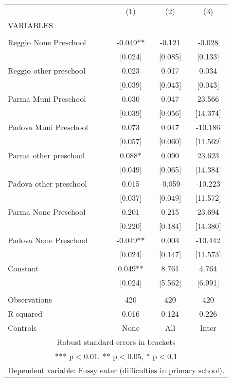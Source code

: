 \begin{tabular}{lccc} \hline
 & (1) & (2) & (3) \\
VARIABLES &  &  &  \\ \hline
 &  &  &  \\
Reggio None Preschool & -0.049** & -0.121 & -0.028 \\
 & [0.024] & [0.085] & [0.133] \\
Reggio other preschool & 0.023 & 0.017 & 0.034 \\
 & [0.039] & [0.043] & [0.043] \\
Parma Muni Preschool & 0.030 & 0.047 & 23.566 \\
 & [0.039] & [0.056] & [14.374] \\
Padova Muni Preschool & 0.073 & 0.047 & -10.186 \\
 & [0.057] & [0.060] & [11.569] \\
Parma other preschool & 0.088* & 0.090 & 23.623 \\
 & [0.049] & [0.065] & [14.384] \\
Padova other preschool & 0.015 & -0.059 & -10.223 \\
 & [0.037] & [0.049] & [11.572] \\
Parma None Preschool & 0.201 & 0.215 & 23.694 \\
 & [0.220] & [0.184] & [14.380] \\
Padova None Preschool & -0.049** & 0.003 & -10.442 \\
 & [0.024] & [0.147] & [11.573] \\
Constant & 0.049** & 8.761 & 4.764 \\
 & [0.024] & [5.562] & [6.991] \\
 &  &  &  \\
Observations & 420 & 420 & 420 \\
R-squared & 0.016 & 0.124 & 0.226 \\
 Controls & None & All & Inter \\ \hline
\multicolumn{4}{c}{ Robust standard errors in brackets} \\
\multicolumn{4}{c}{ *** p$<$0.01, ** p$<$0.05, * p$<$0.1} \\
\multicolumn{4}{c}{ Dependent variable: Fussy eater (difficulties in primary school).} \\
\end{tabular}
